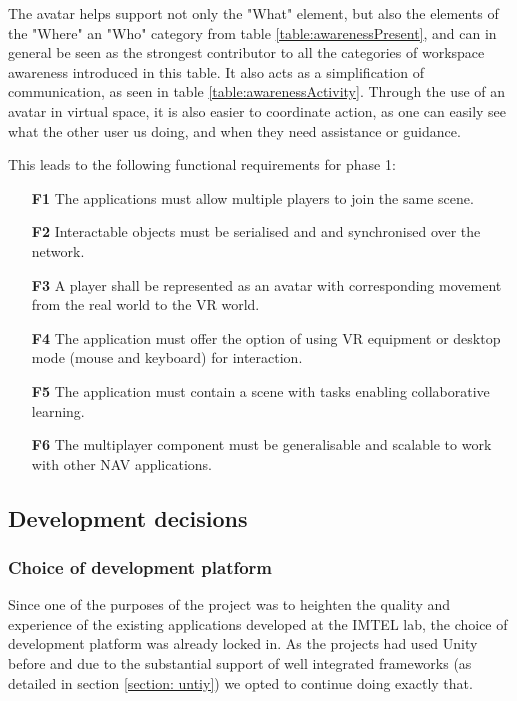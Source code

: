 The avatar helps support not only the "What" element, but also the elements of the "Where" an "Who" category from table \ref{table:awarenessPresent}, and can in general be seen as the strongest contributor to all the categories of workspace awareness introduced in this table. It also acts as a simplification of communication, as seen in table \ref{table:awarenessActivity}. Through the use of an avatar in virtual space, it is also easier to coordinate action, as one can easily see what the other user us doing, and when they need assistance or guidance.


This leads to the following functional requirements for phase 1: 


\begin{enumerate}
  \setlength\itemsep{0em}
  \item [\textbf{F1}] The applications must allow multiple players to join the same scene.
  \item [\textbf{F2}] Interactable objects must be serialised and and synchronised over the network.
  \item [\textbf{F3}] A player shall be represented as an avatar with corresponding movement from the real world to the VR world.
  \item [\textbf{F4}] The application must offer the option of using VR equipment or desktop mode (mouse and keyboard) for interaction.
  \item [\textbf{F5}] The application must contain a scene with tasks enabling collaborative learning.
  \item [\textbf{F6}] The multiplayer component must be generalisable and scalable to work with other NAV applications.
\end{enumerate}

\subsection{Development decisions}
\subsubsection{Choice of development platform}
Since one of the purposes of the project was to heighten the quality and experience of the existing applications developed at the IMTEL lab, the choice of development platform was already locked in. As the projects had used Unity before and due to the substantial support of well integrated frameworks (as detailed in section \ref{section: untiy}) we opted to continue doing exactly that. 

